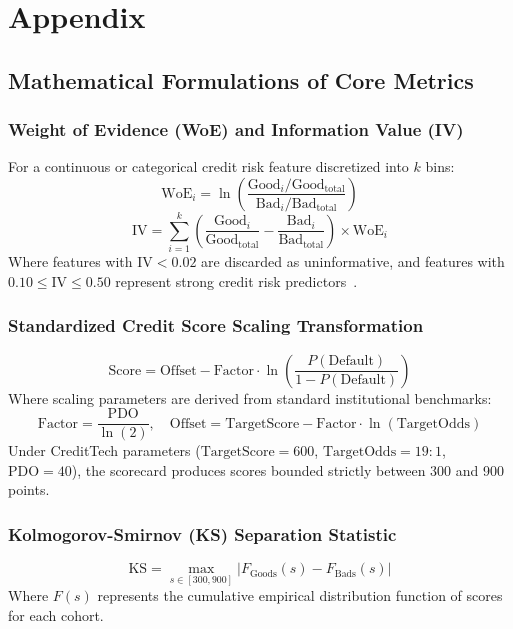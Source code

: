 \chapter{Appendix}
\label{chap:appendix}

\section{Mathematical Formulations of Core Metrics}

\subsection{Weight of Evidence (WoE) and Information Value (IV)}
For a continuous or categorical credit risk feature discretized into $k$ bins:
$$\text{WoE}_i = \ln \left( \frac{\text{Good}_i / \text{Good}_{\text{total}}}{\text{Bad}_i / \text{Bad}_{\text{total}}} \right)$$
$$\text{IV} = \sum_{i=1}^{k} \left( \frac{\text{Good}_i}{\text{Good}_{\text{total}}} - \frac{\text{Bad}_i}{\text{Bad}_{\text{total}}} \right) \times \text{WoE}_i$$
Where features with $\text{IV} < 0.02$ are discarded as uninformative, and features with $0.10 \le \text{IV} \le 0.50$ represent strong credit risk predictors~\cite{thomas_credit_2017}.

\subsection{Standardized Credit Score Scaling Transformation}
$$\text{Score} = \text{Offset} - \text{Factor} \cdot \ln \left( \frac{P(\text{Default})}{1 - P(\text{Default})} \right)$$
Where scaling parameters are derived from standard institutional benchmarks:
$$\text{Factor} = \frac{\text{PDO}}{\ln(2)}, \quad \text{Offset} = \text{TargetScore} - \text{Factor} \cdot \ln(\text{TargetOdds})$$
Under CreditTech parameters ($\text{TargetScore} = 600$, $\text{TargetOdds} = 19:1$, $\text{PDO} = 40$), the scorecard produces scores bounded strictly between 300 and 900 points.

\subsection{Kolmogorov-Smirnov (KS) Separation Statistic}
$$\text{KS} = \max_{s \in [300, 900]} \left| F_{\text{Goods}}(s) - F_{\text{Bads}}(s) \right|$$
Where $F(s)$ represents the cumulative empirical distribution function of scores for each cohort.

